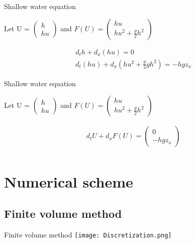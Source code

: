 \documentclass{beamer}
\begin{document}
            \begin{frame}{Shallow water equation}
                \begin{center}
                    Let U = $\begin{pmatrix} h \\ hu \end{pmatrix}$ and $F(U)=\begin{pmatrix} hu \\ hu^2 + \frac{g}{2}h^2 \end{pmatrix}$
                \end{center}
                
                \begin{align*}
                    &d_t h + d_x(hu) = 0 \\
                    &d_t(hu) + d_x\left( hu^2+ \frac{g}{2}gh^2 \right) = - hgz_x
                \end{align*}
            \end{frame}
            \begin{frame}{Shallow water equation}
                \begin{center}
                    Let U = $\begin{pmatrix} h \\ hu \end{pmatrix}$ and $F(U)=\begin{pmatrix} hu \\ hu^2 + \frac{g}{2}h^2 \end{pmatrix}$
                \end{center}
                
                \begin{align*}
                    &d_t U + d_x F(U) =  \begin{pmatrix}0\\ -hgz_x\end{pmatrix}\\
                \end{align*}
            \end{frame}
            
    \section{Numerical scheme}
        \subsection{Finite volume method}
            \begin{frame}{Finite volume method}
                \texttt{[image: Discretization.png]}
            \end{frame}
\end{document}
